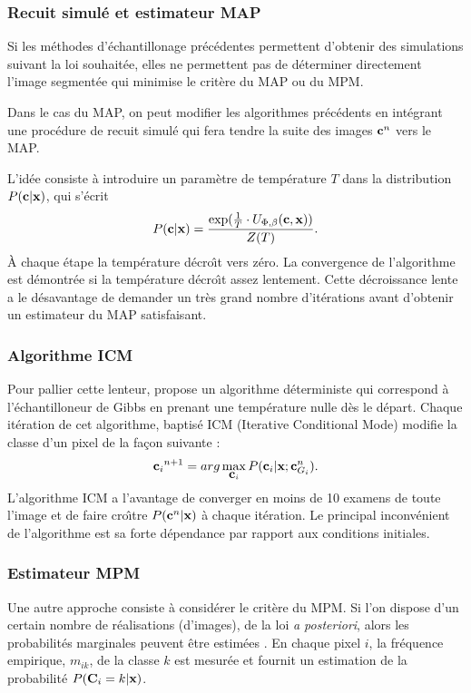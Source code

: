 \subsubsection{Recuit simul\'e et estimateur MAP}
Si les m\'ethodes d'\'echantillonage pr\'ec\'edentes permettent d'obtenir des 
simulations suivant la loi souhait\'ee, elles  ne permettent  pas de d\'eterminer
directement l'image segment\'ee qui minimise le crit\`ere du MAP ou du MPM. 

Dans le cas du MAP, on peut modifier les algorithmes pr\'ec\'edents en 
int\'egrant une proc\'edure de recuit simul\'e qui fera tendre
la suite des images $\mbox{\bf c}^n$ vers le MAP.

L'id\'ee consiste \`a introduire  un param\`etre de temp\'erature
$T$ dans la distribution  $P(\mbox{\bf c} | \mbox{\bf x})$, qui s'\'ecrit
$$
P(\mbox{\bf c} | \mbox{\bf x})=\frac{\exp(\frac{1}{T} \cdot U_{\Phi,\beta}(\mbox{\bf c},\mbox{\bf x}))}{Z(T)}.
$$
\`A chaque \'etape la temp\'erature d\'ecro\^{\i}t vers z\'ero. La convergence de l'algorithme
est d\'emontr\'ee si la temp\'erature d\'ecro\^{\i}t assez lentement. Cette
d\'ecroissance lente a le d\'esavantage de demander un tr\`es grand nombre 
d'it\'erations avant d'obtenir un estimateur du MAP satisfaisant. 

\subsubsection{Algorithme ICM}
Pour pallier cette lenteur,  propose un algorithme
d\'eterministe qui correspond \`a l'\'echantilloneur de Gibbs en prenant une
temp\'erature nulle d\`es le d\'epart. Chaque it\'eration de cet algorithme,
baptis\'e ICM (Iterative Conditional Mode) modifie la classe 
d'un pixel de la fa\c{c}on suivante : 
$$
{\mbox{\bf c}_i}^{n+1}=arg \max_{\mbox{\bf c}_i} P(\mbox{\bf c}_i | \mbox{\bf x}; \mbox{\bf c}_{G_i}^{n}).
$$
L'algorithme ICM a l'avantage de converger en moins de 10 examens
de toute l'image et de faire cro\^{\i}tre $P(\mbox{\bf c}^n | \mbox{\bf x})$ \`a chaque
it\'eration. Le principal inconv\'enient de l'algorithme est
sa forte d\'ependance par rapport aux conditions  initiales.


\subsubsection{Estimateur  MPM}
Une autre approche consiste \`a consid\'erer le crit\`ere du MPM.
Si l'on dispose d'un certain nombre de r\'ealisations (d'images),
de la loi {\em a posteriori}, alors les  probabilit\'es marginales 
\cite{Marroquin1993} peuvent \^etre estim\'ees . 
En chaque pixel $i$, la fr\'equence  empirique, $m_{ik}$, 
de la classe $k$ est mesur\'ee et fournit un estimation 
de la probabilit\'e  $P( \mbox{\bf C}_i=k | \mbox{\bf x})$. 

